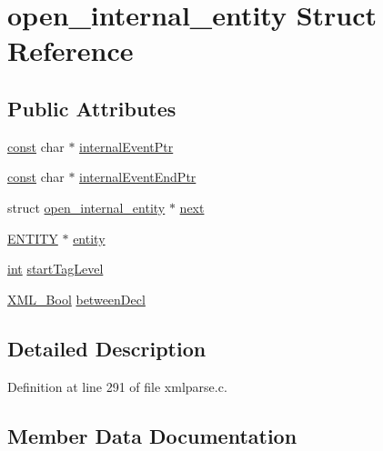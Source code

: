 \hypertarget{structopen__internal__entity}{}\section{open\+\_\+internal\+\_\+entity Struct Reference}
\label{structopen__internal__entity}
\subsection*{Public Attributes}
\begin{DoxyCompactItemize}
\item 
\hyperlink{getopt1_8c_a2c212835823e3c54a8ab6d95c652660e}{const} char $\ast$ \hyperlink{structopen__internal__entity_a6deabfb6ca4ee14b08d7e83937135570}{internal\+Event\+Ptr}
\item 
\hyperlink{getopt1_8c_a2c212835823e3c54a8ab6d95c652660e}{const} char $\ast$ \hyperlink{structopen__internal__entity_a479d92074b2cb942f8988be28e9f88bf}{internal\+Event\+End\+Ptr}
\item 
struct \hyperlink{structopen__internal__entity}{open\+\_\+internal\+\_\+entity} $\ast$ \hyperlink{structopen__internal__entity_a0b4f673ac931c37b732241224bcdaceb}{next}
\item 
\hyperlink{struct_e_n_t_i_t_y}{E\+N\+T\+I\+TY} $\ast$ \hyperlink{structopen__internal__entity_a265285cbe3faafa30f00582aba718101}{entity}
\item 
\hyperlink{xmltok_8h_a5a0d4a5641ce434f1d23533f2b2e6653}{int} \hyperlink{structopen__internal__entity_a0ea9487efef54876450978d24ecf49d6}{start\+Tag\+Level}
\item 
\hyperlink{amiga_2include_2libraries_2expat_8h_a5fe41bca8b7a23b2405f1b967e70f33a}{X\+M\+L\+\_\+\+Bool} \hyperlink{structopen__internal__entity_a44e498218b27549536619d532870a5e4}{between\+Decl}
\end{DoxyCompactItemize}


\subsection{Detailed Description}


Definition at line 291 of file xmlparse.\+c.



\subsection{Member Data Documentation}
